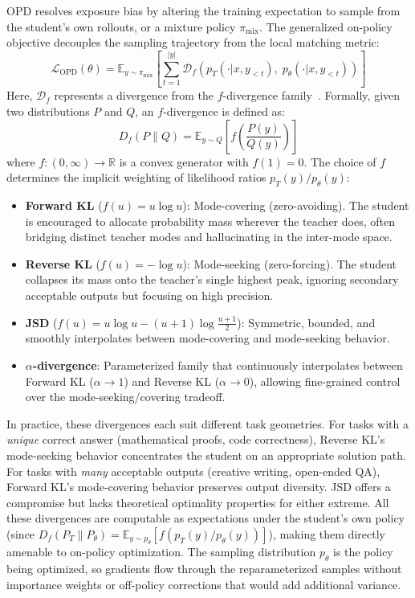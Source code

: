 \documentclass{article} %
\newcommand{\E}{\mathbb{E}}
\newcommand{\ptheta}{p_\theta}
\newcommand{\pteacher}{p_T}
\newcommand{\loss}{\mathcal{L}}
\begin{document}
OPD resolves exposure bias by altering the training expectation to sample from the student's own rollouts, or a mixture policy $\pi_{\mathrm{mix}}$. The generalized on-policy objective decouples the sampling trajectory from the local matching metric:
\begin{equation}
    \loss_{\mathrm{OPD}}(\theta) = \E_{y \sim \pi_{\mathrm{mix}}} \left[ \sum_{t=1}^{|y|} \mathcal{D}_f ( \pteacher(\cdot | x, y_{<t}),\; \ptheta(\cdot | x, y_{<t}) ) \right]
\end{equation}
Here, $\mathcal{D}_f$ represents a divergence from the $f$-divergence family~\citep{2307.15190}. Formally, given two distributions $P$ and $Q$, an $f$-divergence is defined as:
\begin{equation}
    D_f(P \parallel Q) = \E_{y \sim Q}\left[f\!\left(\frac{P(y)}{Q(y)}\right)\right]
\end{equation}
where $f: (0,\infty) \to \mathbb{R}$ is a convex generator with $f(1) = 0$. The choice of $f$ determines the implicit weighting of likelihood ratios $\pteacher(y)/\ptheta(y)$:

\begin{itemize}[nosep]
    \item \textbf{Forward KL} ($f(u) = u \log u$): Mode-covering (zero-avoiding). The student is encouraged to allocate probability mass wherever the teacher does, often bridging distinct teacher modes and hallucinating in the inter-mode space.
    \item \textbf{Reverse KL} ($f(u) = -\log u$): Mode-seeking (zero-forcing). The student collapses its mass onto the teacher's single highest peak, ignoring secondary acceptable outputs but focusing on high precision.
    \item \textbf{JSD} ($f(u) = u\log u - (u+1)\log\frac{u+1}{2}$): Symmetric, bounded, and smoothly interpolates between mode-covering and mode-seeking behavior.
    \item \textbf{$\alpha$-divergence}: Parameterized family that continuously interpolates between Forward KL ($\alpha \to 1$) and Reverse KL ($\alpha \to 0$), allowing fine-grained control over the mode-seeking/covering tradeoff.
\end{itemize}

In practice, these divergences each suit different task geometries. For tasks with a \emph{unique} correct answer (mathematical proofs, code correctness), Reverse KL's mode-seeking behavior concentrates the student on an appropriate solution path. For tasks with \emph{many} acceptable outputs (creative writing, open-ended QA), Forward KL's mode-covering behavior preserves output diversity. JSD offers a compromise but lacks theoretical optimality properties for either extreme. All these divergences are computable as expectations under the student's own policy (since $D_f(P_T \parallel P_\theta) = \E_{y \sim \ptheta}[f(\pteacher(y)/\ptheta(y))]$), making them directly amenable to on-policy optimization. The sampling distribution $\ptheta$ is the policy being optimized, so gradients flow through the reparameterized samples without importance weights or off-policy corrections that would add additional variance.
\end{document}
